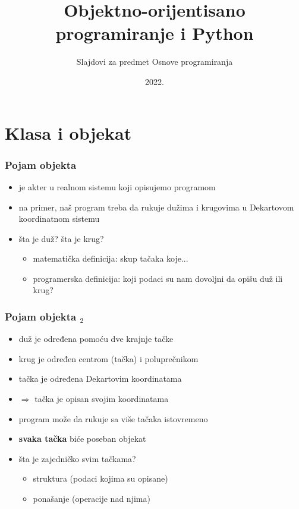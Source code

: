 \documentclass[utf8,compress,aspectratio=169]{beamer}
\title{Objektno-orijentisano programiranje i Python}
\subtitle{\tiny{Slajdovi za predmet Osnove programiranja}}
\institute{Katedra za informatiku, Fakultet tehničkih nauka, Novi Sad}
\date{2022.}
\begin{document}
\expandafter\def\csname PY@tok@err\endcsname{}

\frame{\titlepage}


\section[Klasa i objekat]{Klasa i objekat}

\begin{frame}[fragile]
  \frametitle{Pojam objekta}
  \begin{itemize}
    \item {} je akter u realnom sistemu koji opisujemo programom
    \item na primer, naš program treba da rukuje dužima i krugovima u Dekartovom koordinatnom sistemu
    \item šta je duž? šta je krug?
    \begin{itemize}
      \item matematička definicija: skup tačaka koje...
      \item programerska definicija: koji podaci su nam dovoljni da opišu duž ili krug?
    \end{itemize}
  \end{itemize}
\end{frame}

\begin{frame}[fragile]
  \frametitle{Pojam objekta $_2$}
  \begin{itemize}
    \item duž je određena pomoću dve krajnje tačke
    \item krug je određen centrom (tačka) i poluprečnikom
    \item tačka je određena Dekartovim koordinatama
    \item $\Rightarrow$ tačka je  opisan svojim koordinatama
    \item program može da rukuje sa više tačaka istovremeno
    \item \textbf{svaka tačka} biće poseban objekat
    \item šta je zajedničko svim tačkama?
    \begin{itemize}
      \item struktura (podaci kojima su opisane)
      \item ponašanje (operacije nad njima)
    \end{itemize}
  \end{itemize}
\end{frame}
\end{document}
